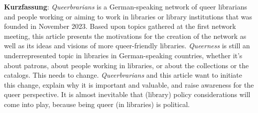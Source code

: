 \textbf{Kurzfassung}: \textit{Queerbrarians} is a German-speaking network of
queer librarians and people working or aiming to work in libraries or
library institutions that was founded in November 2023. Based upon
topics gathered at the first network meeting, this article presents the
motivations for the creation of the network as well as its ideas and
visions of more queer-friendly libraries. \textit{Queerness} is still an
underrepresented topic in libraries in German-speaking countries,
whether it's about patrons, about people working in libraries, or about
the collections or the catalogs. This needs to change. \textit{Queerbrarians} and
this article want to initiate this change, explain why it is important
and valuable, and raise awareness for the queer perspective. It is
almost inevitable that (library) policy considerations will come into
play, because being queer (in libraries) is political.
